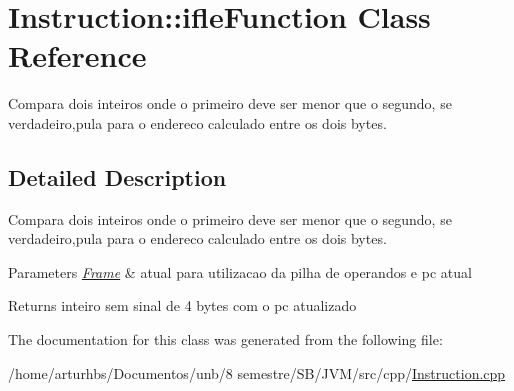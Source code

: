 \hypertarget{classInstruction_1_1ifleFunction}{}\section{Instruction\+:\+:ifle\+Function Class Reference}
\label{classInstruction_1_1ifleFunction}


Compara dois inteiros onde o primeiro deve ser menor que o segundo, se verdadeiro,pula para o endereco calculado entre os dois bytes.  




\subsection{Detailed Description}
Compara dois inteiros onde o primeiro deve ser menor que o segundo, se verdadeiro,pula para o endereco calculado entre os dois bytes. 


\begin{DoxyParams}{Parameters}
{\em \hyperlink{classFrame}{Frame}} & atual para utilizacao da pilha de operandos e pc atual \\
\hline
\end{DoxyParams}
\begin{DoxyReturn}{Returns}
inteiro sem sinal de 4 bytes com o pc atualizado 
\end{DoxyReturn}


The documentation for this class was generated from the following file\+:\begin{DoxyCompactItemize}
\item 
/home/arturhbs/\+Documentos/unb/8 semestre/\+S\+B/\+J\+V\+M/src/cpp/\hyperlink{Instruction_8cpp}{Instruction.\+cpp}\end{DoxyCompactItemize}
